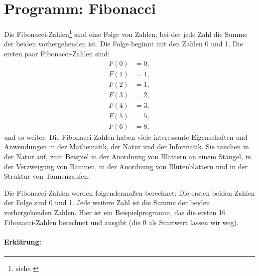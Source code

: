 \section{Programm: Fibonacci}
\label{sec:c:fibonacci}

Die Fibonacci-Zahlen\footnote{siehe \cite{wikipedia:fibonacci}} sind eine Folge von Zahlen, bei der jede Zahl die Summe der beiden vorhergehenden ist. Die Folge beginnt mit den Zahlen 0 und 1. Die ersten paar Fibonacci-Zahlen sind:
\begin{align*}
  F(0) &= 0, \\
  F(1) &= 1, \\
  F(2) &= 1, \\
  F(3) &= 2, \\
  F(4) &= 3, \\
  F(5) &= 5, \\
  F(6) &= 8, 
\end{align*}
und so weiter. Die Fibonacci-Zahlen haben viele interessante Eigenschaften und Anwendungen in der Mathematik, der Natur und der Informatik. Sie tauchen in der Natur auf, zum Beispiel in der Anordnung von Blättern an einem Stängel, in der Verzweigung von Bäumen, in der Anordnung von Blütenblättern und in der Struktur von Tannenzapfen. 

Die Fibonacci-Zahlen werden folgendermaßen berechnet: Die ersten beiden Zahlen der Folge sind 0 und 1. Jede weitere Zahl ist die Summe der beiden vorhergehenden Zahlen. Hier ist ein Beispielprogramm, das die ersten 16 Fibonacci-Zahlen berechnet und ausgibt (die 0 als Startwert lassen wir weg).


\paragraph{Erklärung:}

